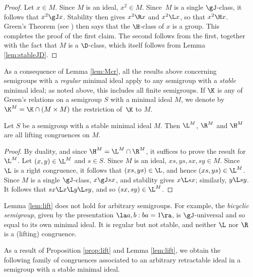 \begin{proof}
Let $x\in M$.  Since $M$ is an ideal, $x^2\in M$.  Since~$M$ is a single $\gJ$-class, it follows that $x^2\gJ x$.  Stability then gives $x^2\R x$ and $x^2\L x$, so that $x^2\H x$.  Green's Theorem (see \cite[Theorem 2.2.5]{Howie}) then says that the $\H$-class of $x$ is a group.  This completes the proof of the first claim.  The second follows from the first, together with the fact that $M$ is a $\D$-class, which itself follows from Lemma \ref{lem:stableJD}.
\end{proof}

As a consequence of Lemma \ref{lem:Mcr}, all the results above concerning semigroups with a \emph{regular} minimal ideal apply to any semigroup with a \emph{stable} minimal ideal; as noted above, this includes all finite semigroups.
%
If $\K$ is any of Green's relations on a semigroup $S$ with a minimal ideal $M$, we denote by ${\K^M}={\K}\cap(M\times M)$ the restriction of~$\K$ to $M$.

\begin{lemma}\label{lem:lift}
Let $S$ be a semigroup with a stable minimal ideal $M$.  Then $\L^M$, $\R^M$ and $\H^M$ are all lifting congruences on $M$.
\end{lemma}

\begin{proof} By duality, and since ${\H^M}={\L^M}\cap{\R^M}$, it suffices to prove the
result for $\L^M$.  Let $(x,y)\in{\L^M}$ and $s\in S$.  Since $M$ is an ideal,
$xs,ys,sx,sy\in M$.  Since $\L$ is a right congruence, it follows that
$(xs,ys)\in{\L}$, and hence $(xs,ys)\in{\L^M}$.  Since $M$ is a single
$\gJ$-class, $x\gJ sx$, and stability gives $x\L sx$; similarly, $y\L sy$.  It
follows that $sx\L x\L y\L sy$, and so $(sx,sy)\in{\L^M}$. \end{proof}

Lemma \ref{lem:lift} does not hold for arbitrary semigroups.  For example, the \emph{bicyclic semigroup}, given by the presentation $\la a,b:ba=1\ra$, is $\gJ$-universal and so equal to its own minimal ideal.  It is regular but not stable, and neither $\L$ nor $\R$ is a (lifting) congruence.

As a result of Proposition \ref{prop:lift} and Lemma \ref{lem:lift}, we obtain
the following family of congruences associated to an arbitrary retractable
ideal in a semigroup with a stable minimal ideal.


